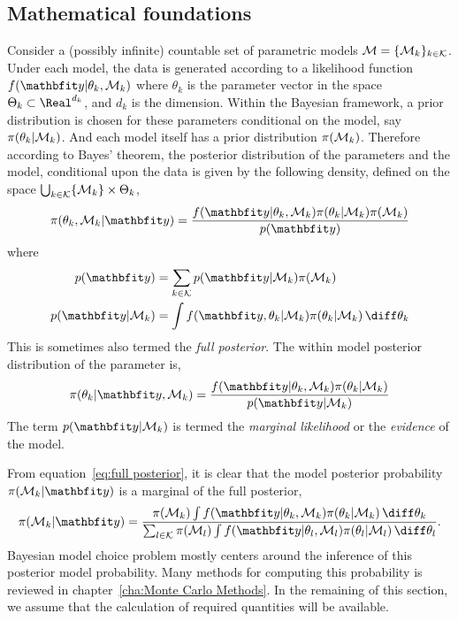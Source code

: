 \subsection{Mathematical foundations}
\label{sub:Mathematical foundations}

Consider a (possibly infinite) countable set of parametric models $\mathcal{M} =
\{\mathcal{M}_k\}_{k\in\mathcal{K}}$. Under each model, the data is generated according to
a likelihood function $f(\data|\theta_k,\calM_k)$ where $\theta_k$ is the
parameter vector in the space $\Theta_k\subset\Real^{d_k}$, and $d_k$ is the
dimension. Within the Bayesian framework, a prior distribution is chosen for
these parameters conditional on the model, say $\pi(\theta_k|\mathcal{M}_k)$. And
each model itself has a prior distribution $\pi(\mathcal{M}_k)$. Therefore according
to Bayes' theorem, the posterior distribution of the parameters and the model,
conditional upon the data is given by the following density, defined on the
space $\bigcup_{k\in\mathcal{K}}\{\mathcal{M}_k\}\times\Theta_k$,
\begin{equation}
  \pi(\theta_k,\calM_k|\data) =
  \frac{f(\data|\theta_k,\calM_k)\pi(\theta_k|\calM_k)\pi(\calM_k)}{p(\data)}
  \label{eq:full posterior}
\end{equation}
where
\begin{align}
  p(\data) &= \sum_{k\in\calK}p(\data|\calM_k)\pi(\calM_k) \\
  p(\data|\calM_k) &=
  \int f(\data,\theta_k|\calM_k)\pi(\theta_k|\calM_k)\intd\theta_k
  \label{eq:marginal likelihood}
\end{align}
This is
sometimes also termed the \emph{full posterior}. The within model posterior
distribution of the parameter is,
\begin{equation}
  \pi(\theta_k|\data,\calM_k) =
  \frac{f(\data|\theta_k,\calM_k)\pi(\theta_k|\calM_k)}{p(\data|\calM_k)}
  \label{eq:within posterior}
\end{equation}
The term $p(\data|\calM_k)$ is termed the \emph{marginal likelihood} or the
\emph{evidence} of the model.

From equation~\eqref{eq:full posterior}, it is clear that the model posterior
probability $\pi(\calM_k|\data)$ is a marginal of the full posterior,
\begin{equation}
  \pi(\calM_k|\data) =
  \frac{
    \pi(\calM_k)
    \int f(\data|\theta_k,\calM_k)\pi(\theta_k|\calM_k)\intd\theta_k
  }{
    \sum_{l\in\calK}\pi(\calM_l)
    \int f(\data|\theta_l,\calM_l)\pi(\theta_l|\calM_l)\intd\theta_l
  }.
  \label{eq:post model prob}
\end{equation}
Bayesian model choice problem mostly centers around the inference of this
posterior model probability. Many methods for computing this probability is
reviewed in chapter~\ref{cha:Monte Carlo Methods}. In the remaining of this
section, we assume that the calculation of required quantities will be
available.


